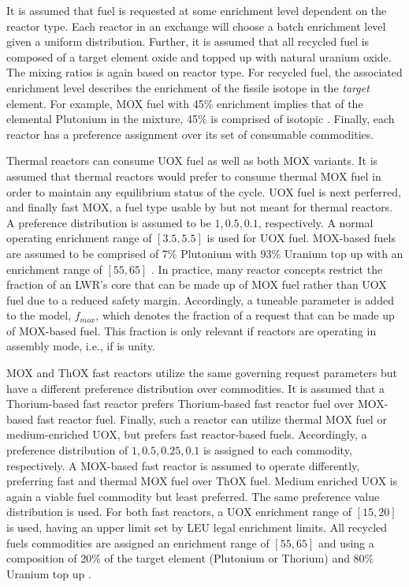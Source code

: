 It is assumed that fuel is requested at some enrichment level dependent on the
reactor type. Each reactor in an exchange will choose a batch enrichment level
given a uniform distribution. Further, it is assumed that all recycled fuel is
composed of a target element oxide and topped up with natural uranium oxide. The
mixing ratios is again based on reactor type. For recycled fuel, the associated
enrichment level describes the enrichment of the fissile isotope in the
\textit{target} element. For example, MOX fuel with 45\% enrichment implies that
of the elemental Plutonium in the mixture, 45\% is comprised of isotopic
. Finally, each reactor has a preference assignment over its set
of consumable commodities.

Thermal reactors can consume UOX fuel as well as both MOX variants. It is
assumed that thermal reactors would prefer to consume thermal MOX fuel in order
to maintain any equilibrium status of the cycle. UOX fuel is next perferred, and
finally fast MOX, a fuel type usable by but not meant for thermal reactors. A
preference distribution is assumed to be ${1, 0.5, 0.1}$, respectively. A normal
operating enrichment range of $[3.5, 5.5]$ is used for UOX fuel. MOX-based fuels
are assumed to be comprised of 7\% Plutonium with 93\% Uranium top up
\cite{bertel2007management} with an enrichment range of $[55, 65]$
\cite{bairiot2003status}. In practice, many reactor concepts restrict the
fraction of an LWR's core that can be made up of MOX fuel rather than UOX fuel
due to a reduced safety margin. Accordingly, a tuneable parameter is added to
the model, $f_{mox}$, which denotes the fraction of a request that can be made
up of MOX-based fuel. This fraction is only relevant if reactors are operating
in assembly mode, i.e., if \frx is unity.

MOX and ThOX fast reactors utilize the same governing request parameters but
have a different preference distribution over commodities. It is assumed that a
Thorium-based fast reactor prefers Thorium-based fast reactor fuel over
MOX-based fast reactor fuel. Finally, such a reactor can utilize thermal MOX
fuel or medium-enriched UOX, but prefers fast reactor-based fuels. Accordingly,
a preference distribution of ${1, 0.5, 0.25, 0.1}$ is assigned to each
commodity, respectively. A MOX-based fast reactor is assumed to operate
differently, preferring fast and thermal MOX fuel over ThOX fuel. Medium
enriched UOX is again a viable fuel commodity but least preferred. The same
preference value distribution is used. For both fast reactors, a UOX enrichment
range of $[15, 20]$ is used, having an upper limit set by LEU legal enrichment
limits. All recycled fuels commodities are assigned an enrichment range of $[55,
  65]$ \cite{bairiot2003status} and using a composition of 20\% of the target
element (Plutonium or Thorium) and 80\% Uranium top up \cite{bairiot2003status}.

